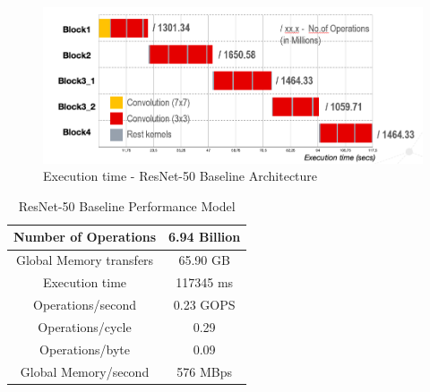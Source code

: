 \begin{figure}[!htb]
  \includegraphics[width=\textwidth,height=\textheight,keepaspectratio]{img/ResNet_baseline_execution.png}
  \caption{Execution time - ResNet-50 Baseline Architecture}
  \label{fig:ResNet50_baseline_time}
\end{figure}


\begin{table}[]
\centering
\captionsetup{
justification = centering
}
\caption{ResNet-50 Baseline Performance Model}
\label{tab:ResNetBaselinePerformanceModel}
\begin{tabular}{|c|c|}
\hline
Number of Operations     & 6.94 Billion \\ \hline
Global Memory transfers & 65.90 GB     \\ \hline
Execution time             & 117345 ms    \\ \hline
Operations/second    & 0.23 GOPS    \\ \hline
Operations/cycle     & 0.29         \\ \hline
Operations/byte      & 0.09         \\ \hline
Global Memory/second    & 576 MBps     \\ \hline
\end{tabular}
\end{table}

